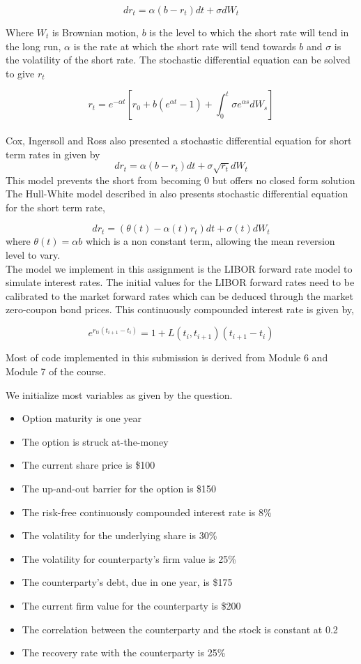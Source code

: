 \documentclass[11pt]{article}
\begin{document}
\[
d r_t= \alpha (b - r_t) dt + \sigma dW_t
\]

Where $W_t$ is Brownian motion, $b$ is the level to which the short rate will tend in the long run, $\alpha$ is the rate at which the short rate will tend towards $b$ and $\sigma$ is the volatility of the short rate.  The stochastic differential equation can be solved to give $r_t$

\[
r_t= e^{-\alpha t} [r_0 + b(e^{\alpha t} - 1)+\int^t_0 \sigma e^{\alpha s} dW_s ]
\]
\\

Cox, Ingersoll and Ross also presented a stochastic differential equation for short term rates in \cite{CIR1} given by
\[
d r_t= \alpha (b - r_t) dt + \sigma \sqrt{r_t} dW_t
\]
This model prevents the short from becoming 0 but offers no closed form solution\\

The Hull-White model described in \cite{HW1} also presents stochastic differential equation for the short term rate,

\[
d r_t= (\theta(t) - \alpha(t) r_t) dt + \sigma (t) dW_t
\]
where $\theta(t) = \alpha b$ which is a non constant term, allowing the mean reversion level to vary. \\

The model we implement in this assignment is the LIBOR forward rate model to simulate interest rates.  The initial values for the LIBOR forward rates need to be calibrated to the market forward rates which can be deduced through the market zero-coupon bond prices. This continuously compounded interest rate is given by,

\[
e^{r_{ti} (t_{i+1} - t_i)}= 1 + L(t_i,t_{i+1})(t_{i+1} -t_i )
\]

Most of code implemented in this submission is derived from Module 6 \cite{M6} and Module 7 \cite{M7} of the course.

We initialize most variables as given by the question.

\begin{itemize}
    \item Option maturity is one year
    \item The option is struck at-the-money
    \item The current share price is \$100
    \item The up-and-out barrier for the option is \$150
    \item The risk-free continuously compounded interest rate is 8\%
    \item The volatility for the underlying share is 30\%
    \item The volatility for counterparty's firm value is 25\%
    \item The counterparty's debt, due in one year, is  \$175
    \item The current firm value for the counterparty is \$200
    \item The correlation between the counterparty and the stock is constant at 0.2
    \item The recovery rate with the counterparty is 25\%

\end{itemize}
\end{document}
